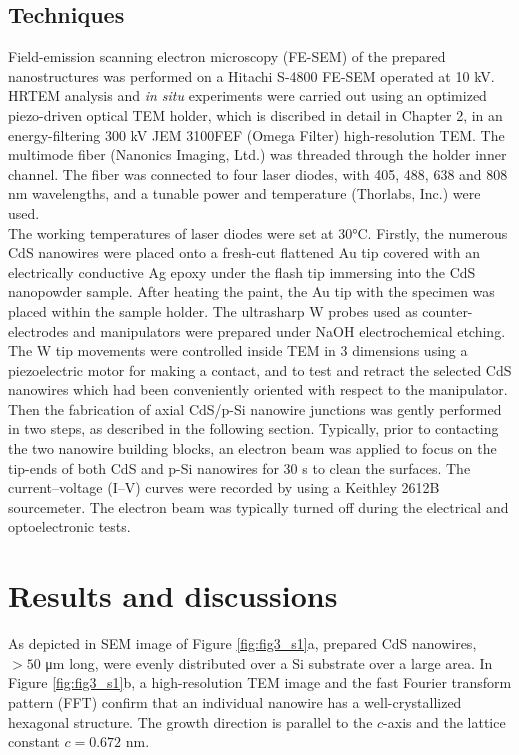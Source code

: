 \subsection{Techniques}
Field-emission scanning electron microscopy (FE-SEM) of the prepared nanostructures was performed on a Hitachi S-4800 FE-SEM operated at 10 kV. HRTEM analysis and {\em in situ} experiments were carried out using an optimized piezo-driven optical TEM holder, which is discribed in detail in Chapter 2, in an energy-filtering 300 kV JEM 3100FEF (Omega Filter) high-resolution TEM. The multimode fiber (Nanonics Imaging, Ltd.) was threaded through the holder inner channel. The fiber was connected to four laser diodes, with 405, 488, 638 and 808 nm wavelengths, and a tunable power and temperature (Thorlabs, Inc.) were used. \\
The working temperatures of laser diodes were set at 30°C. Firstly, the numerous CdS nanowires were placed onto a fresh-cut flattened Au tip covered with an electrically conductive Ag epoxy under the flash tip immersing into the CdS nanopowder sample. After heating the paint, the Au tip with the specimen was placed within the sample holder. The ultrasharp W probes used as counter-electrodes and manipulators were prepared under NaOH electrochemical etching. The W tip movements were controlled inside TEM in 3 dimensions using a piezoelectric motor for making a contact, and to test and retract the selected CdS nanowires which had been conveniently oriented with respect to the manipulator. Then the fabrication of axial CdS/p-Si nanowire junctions was gently performed in two steps, as described in the following section. Typically, prior to contacting the two nanowire building blocks, an electron beam was applied to focus on the tip-ends of both CdS and p-Si nanowires for 30 s to clean the surfaces. The current–voltage (I–V) curves were recorded by using a Keithley 2612B sourcemeter. The electron beam was typically turned off during the electrical and optoelectronic tests. 


\section{Results and discussions}
As depicted in SEM image of Figure \ref{fig:fig3_s1}a, prepared CdS nanowires, $>50$ μm long, were evenly distributed over a Si substrate over a large area. In Figure \ref{fig:fig3_s1}b, a high-resolution TEM image and the fast Fourier transform pattern (FFT) confirm that an individual nanowire has a well-crystallized hexagonal structure. The growth direction is parallel to the $c$-axis and the lattice constant $c = 0.672$ nm. 

